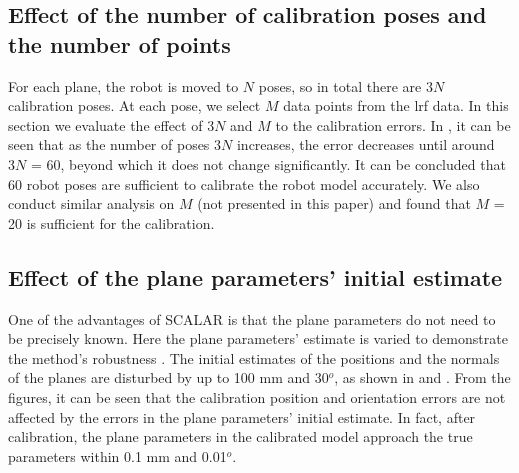 \subsection{Effect of the number of calibration poses and the number of points}
\label{sec:calib_poses}
For each plane, the robot is moved to $N$ poses, so in total there are $3N$ calibration poses. At each pose, we select $M$ data points from the \ac{lrf} data. In this section we evaluate the effect of $3N$ and $M$ to the calibration errors. In , it can be seen that as the number of poses $3N$ increases, the error decreases until around $3N$ = 60, beyond which it does not change significantly. It can be concluded that 60 robot poses are sufficient to calibrate the robot model accurately. We also conduct similar analysis on $M$ (not presented in this paper) and found that $M$ = 20 is sufficient for the calibration.


\subsection{Effect of the plane parameters' initial estimate}
\label{sec:plane_params}
One of the advantages of SCALAR is that the plane parameters do not need to be precisely known. Here the plane parameters' estimate is varied to demonstrate the method's robustness . The initial estimates of the positions and the normals of the planes are disturbed by up to 100 mm and 30$^o$, as shown in  and . From the figures, it can be seen that the calibration position and orientation errors are not affected by the errors in the plane parameters' initial estimate. In fact, after calibration, the plane parameters in the calibrated model approach the true parameters within 0.1 mm and 0.01$^o$.





